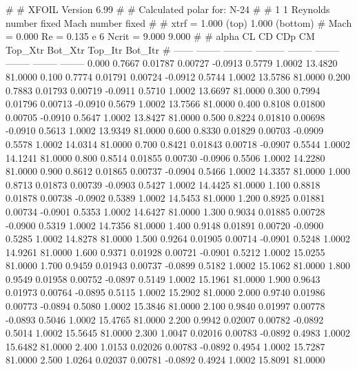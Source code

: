 #  
#       XFOIL         Version 6.99
#  
# Calculated polar for: N-24                                            
#  
# 1 1 Reynolds number fixed          Mach number fixed         
#  
# xtrf =   1.000 (top)        1.000 (bottom)  
# Mach =   0.000     Re =     0.135 e 6     Ncrit =   9.000  9.000
#  
#   alpha    CL        CD       CDp       CM     Top_Xtr  Bot_Xtr  Top_Itr  Bot_Itr
#  ------ -------- --------- --------- -------- -------- -------- -------- --------
   0.000   0.7667   0.01787   0.00727  -0.0913   0.5779   1.0002  13.4820  81.0000
   0.100   0.7774   0.01791   0.00724  -0.0912   0.5744   1.0002  13.5786  81.0000
   0.200   0.7883   0.01793   0.00719  -0.0911   0.5710   1.0002  13.6697  81.0000
   0.300   0.7994   0.01796   0.00713  -0.0910   0.5679   1.0002  13.7566  81.0000
   0.400   0.8108   0.01800   0.00705  -0.0910   0.5647   1.0002  13.8427  81.0000
   0.500   0.8224   0.01810   0.00698  -0.0910   0.5613   1.0002  13.9349  81.0000
   0.600   0.8330   0.01829   0.00703  -0.0909   0.5578   1.0002  14.0314  81.0000
   0.700   0.8421   0.01843   0.00718  -0.0907   0.5544   1.0002  14.1241  81.0000
   0.800   0.8514   0.01855   0.00730  -0.0906   0.5506   1.0002  14.2280  81.0000
   0.900   0.8612   0.01865   0.00737  -0.0904   0.5466   1.0002  14.3357  81.0000
   1.000   0.8713   0.01873   0.00739  -0.0903   0.5427   1.0002  14.4425  81.0000
   1.100   0.8818   0.01878   0.00738  -0.0902   0.5389   1.0002  14.5453  81.0000
   1.200   0.8925   0.01881   0.00734  -0.0901   0.5353   1.0002  14.6427  81.0000
   1.300   0.9034   0.01885   0.00728  -0.0900   0.5319   1.0002  14.7356  81.0000
   1.400   0.9148   0.01891   0.00720  -0.0900   0.5285   1.0002  14.8278  81.0000
   1.500   0.9264   0.01905   0.00714  -0.0901   0.5248   1.0002  14.9261  81.0000
   1.600   0.9371   0.01928   0.00721  -0.0901   0.5212   1.0002  15.0255  81.0000
   1.700   0.9459   0.01943   0.00737  -0.0899   0.5182   1.0002  15.1062  81.0000
   1.800   0.9549   0.01958   0.00752  -0.0897   0.5149   1.0002  15.1961  81.0000
   1.900   0.9643   0.01973   0.00764  -0.0895   0.5115   1.0002  15.2902  81.0000
   2.000   0.9740   0.01986   0.00773  -0.0894   0.5080   1.0002  15.3846  81.0000
   2.100   0.9840   0.01997   0.00778  -0.0893   0.5046   1.0002  15.4765  81.0000
   2.200   0.9942   0.02007   0.00782  -0.0892   0.5014   1.0002  15.5645  81.0000
   2.300   1.0047   0.02016   0.00783  -0.0892   0.4983   1.0002  15.6482  81.0000
   2.400   1.0153   0.02026   0.00783  -0.0892   0.4954   1.0002  15.7287  81.0000
   2.500   1.0264   0.02037   0.00781  -0.0892   0.4924   1.0002  15.8091  81.0000

